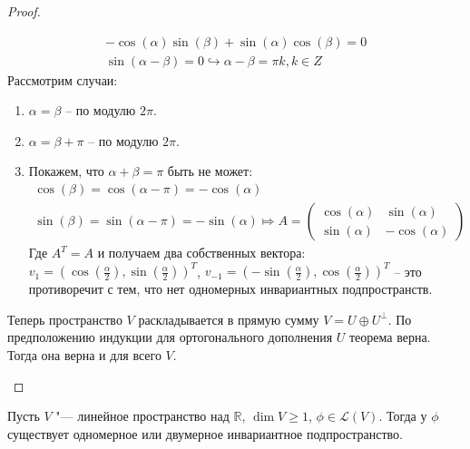 \begin{proof}
\begin{enumerate}
        \begin{gather*}
            -\cos(\alpha) \sin(\beta) + \sin(\alpha) \cos(\beta) = 0 \\
            \sin(\alpha - \beta) = 0 \hookrightarrow \alpha - \beta = \pi k, k \in Z
        \end{gather*}
        Рассмотрим случаи:
        \begin{enumerate}
            \item $\alpha = \beta$ -- по модулю $2\pi$.
            \item $\alpha = \beta + \pi$ -- по модулю $2\pi$.
            \item Покажем, что $\alpha + \beta = \pi$ быть не может:
            \begin{gather*}
                \cos(\beta) = \cos(\alpha - \pi) = -\cos(\alpha) \\
                \sin(\beta) = \sin(\alpha - \pi) = -\sin(\alpha) \Mapsto
                A = \begin{pmatrix}
                        \cos(\alpha)     & \sin(\alpha) \\
                        \sin(\alpha)     & -\cos(\alpha)       
                    \end{pmatrix}
            \end{gather*}
            Где $A^T = A$ и получаем два собственных вектора: $v_1 = (\cos(\frac{\alpha}{2}), \sin(\frac{\alpha}{2}))^T$, $v_{-1} = (-\sin(\frac{\alpha}{2}), \cos(\frac{\alpha}{2}))^T$ -- это противоречит с тем, что нет одномерных инвариантных подпространств.
        \end{enumerate}
        Теперь пространство $V$ раскладывается в прямую сумму $V = U \oplus U^{\perp}$. По предположению индукции для ортогонального дополнения $U$ теорема верна. Тогда она верна и для всего $V$.
    \end{enumerate}
\end{proof}

\begin{proposition}
	Пусть $V$ "--- линейное пространство над $\mathbb{R}$, $\dim{V} \ge 1$, $\phi \in \mathcal{L}(V)$. Тогда у $\phi$ существует одномерное или двумерное инвариантное подпространство.
\end{proposition}

